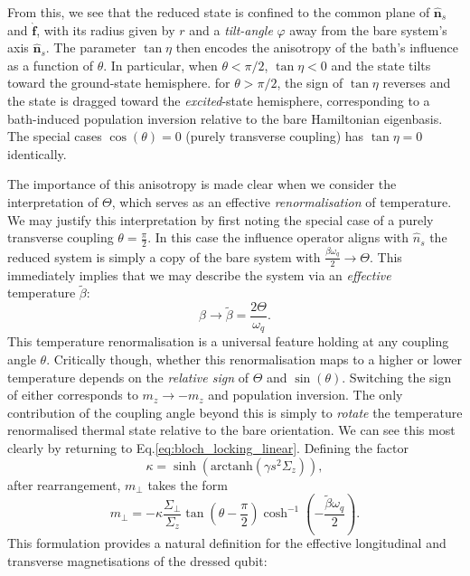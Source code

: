 From this, we see that the reduced state is confined to the common plane of $\hat{\mathbf{n}}_s$ and $\hat{\mathbf{f}}$, with its radius given by $r$ and a \emph{tilt-angle} $\varphi$ away from the bare system's axis $\hat{\mathbf{n}}_s$. The parameter $\tan\eta$ then encodes the anisotropy of the bath's influence as a function of $\theta$.  In particular, when $\theta<\pi/2$, $\tan\eta<0$ and the state tilts toward the ground-state hemisphere. for $\theta>\pi/2$, the sign of $\tan\eta$ reverses and the state is dragged
toward the \emph{excited}-state hemisphere, corresponding to a bath-induced population
inversion relative to the bare Hamiltonian eigenbasis.  The special cases $\cos(\theta)=0$
(purely transverse coupling) has $\tan\eta=0$ identically.

The importance of this anisotropy is made clear when we consider the interpretation of $\Theta$, which serves as an effective \emph{renormalisation} of temperature. We may justify this interpretation by first noting the special case of a purely transverse coupling $\theta =\frac{\pi}{2}$. In this case the influence operator aligns with $\hat{n}_s$ the reduced system is simply a copy of the bare system with $\frac{\beta\omega_q}{2} \to \Theta$. This immediately implies that we may describe the system via an \emph{effective} temperature $\tilde{\beta}$:
\begin{equation}
\beta \to \tilde{\beta}= \frac{2\Theta}{\omega_q}.
\end{equation} 
This temperature renormalisation is a universal feature holding at any coupling angle $\theta$. Critically though, whether this renormalisation maps to a higher or lower temperature depends on the \emph{relative sign} of $\Theta$ and $\sin(\theta)$. Switching the sign of either corresponds to $m_z\to-m_z$ and population inversion.  The only contribution of the coupling angle beyond this is simply to \emph{rotate} the temperature renormalised thermal state relative to the bare orientation. We can see this most clearly by returning to Eq.\eqref{eq:bloch_locking_linear}. Defining the factor 
\begin{equation}
\kappa =\sinh(\mathrm{arctanh}(\gamma s^2 \Sigma_z)),
\end{equation}
after rearrangement, $m_\perp$ takes the form
\begin{equation}
m_\perp = -\kappa\frac{\Sigma_\perp}{\Sigma_z}\tan(\theta-\frac{\pi}{2})\cosh^{-1}\left(-\frac{\tilde{\beta}\omega_q}{2}\right).
\end{equation}
This formulation provides a natural definition for the effective longitudinal and transverse magnetisations of the dressed qubit:
